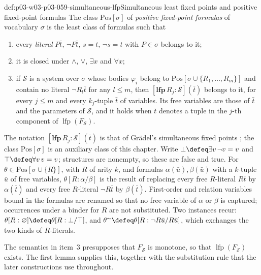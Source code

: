 \begin{hbdefinition}{def:p03-w03-p03-059-simultaneous-lfp}{Simultaneous least fixed points and positive fixed-point formulas}
The class \(\mathrm{Pos}[\sigma]\) of \emph{positive fixed-point formulas}
of vocabulary \(\sigma\) is the least class of formulas such that
\begin{enumerate}
 \item every \emph{literal} \(P\bar t\), \(\neg P\bar t\), \(s=t\),
       \(\neg s=t\) with \(P\in\sigma\) belongs to it;
 \item it is closed under \(\land\), \(\lor\), \(\exists x\) and
       \(\forall x\);
 \item if \(\mathcal S\) is a system over \(\sigma\) whose bodies
       \(\varphi_i\) belong to \(\mathrm{Pos}[\sigma\cup\{R_1,\ldots,R_m\}]\)
       and contain no literal \(\neg R_l\bar t\) for any \(l\leq m\), then
       \([\mathbf{lfp}\,R_j:\mathcal S](\bar t)\) belongs to it, for every
       \(j\leq m\) and every \(k_j\)-tuple \(\bar t\) of variables. Its free
       variables are those of \(\bar t\) and the parameters of
       \(\mathcal S\), and it holds when \(\bar t\) denotes a tuple in the
       \(j\)-th component of \(\operatorname{lfp}(F_{\mathcal S})\).
\end{enumerate}
The notation \([\mathbf{lfp}\,R_j:\mathcal S](\bar t)\) is that of
Gr\"adel's simultaneous fixed points \cite[Thm.~3.3.43,
p.~174]{Gradel2007FMTDescriptiveChapter}; the class \(\mathrm{Pos}[\sigma]\) is an
auxiliary class of this chapter. Write \(\bot\defeq\exists v\,\neg v=v\)
and \(\top\defeq\forall v\,v=v\); structures are nonempty, so these are
false and true. For \(\theta\in\mathrm{Pos}[\sigma\cup\{R\}]\), with \(R\)
of arity \(k\), and formulas \(\alpha(\bar u),\beta(\bar u)\) with a
\(k\)-tuple \(\bar u\) of free variables, \(\theta[R:\alpha/\beta]\) is the
result of replacing every free \(R\)-literal \(R\bar t\) by
\(\alpha(\bar t)\) and every free \(R\)-literal \(\neg R\bar t\) by
\(\beta(\bar t)\). First-order and relation variables bound in the formulas
are renamed so that no free variable of \(\alpha\) or \(\beta\) is captured;
occurrences under a binder for \(R\) are not substituted.
Two instances recur: \(\theta[R:\varnothing]\defeq\theta[R:\bot/\top]\),
and \(\theta^{\sim}\defeq\theta[R:\neg R\bar u/R\bar u]\), which exchanges
the two kinds of \(R\)-literals.
\end{hbdefinition}

The semantics in item~3 presupposes that \(F_{\mathcal S}\) is monotone, so
that \(\operatorname{lfp}(F_{\mathcal S})\) exists. The first lemma supplies
this, together with the substitution rule that the later constructions use
throughout.

